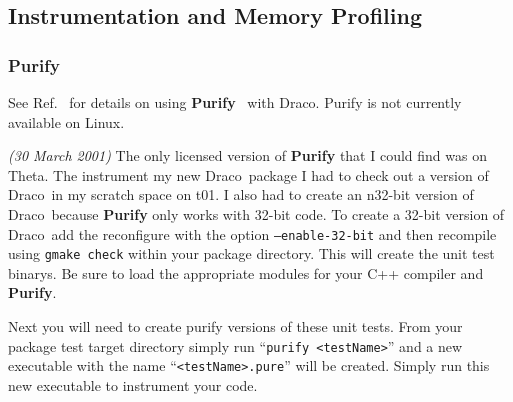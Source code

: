 \documentclass[11pt]{nmemo}
\newcommand{\comp}[1]{\normalfont\footnotesize\texttt{#1}\normalsize}
\newcommand{\draco}{{\normalfont\sffamily Draco}}
\begin{document}




\subsection{Instrumentation and Memory Profiling}

\subsubsection{Purify}

See Ref.~\cite{draco-purify} for details on using
\textbf{Purify}~\cite{purify} with \draco.  Purify is not currently
available on Linux.  

\emph{(30 March 2001)} The only licensed version of \textbf{Purify}
that I could find was on Theta.  The instrument my new \draco\ package
I had to check out a version of \draco\ in my scratch space on t01.  I
also had to create an n32-bit version of \draco\ because
\textbf{Purify} only works with 32-bit code.  To create a 32-bit
version of \draco\ add the reconfigure with the option
\comp{--enable-32-bit} and then recompile using \comp{gmake check}
within your package directory.  This will create the unit test
binarys.  Be sure to load the appropriate modules for your C++
compiler and \textbf{Purify}.

Next you will need to create purify versions of these unit tests.
From your package test target directory simply run ``\comp{purify
 <testName>}'' and a new executable with the name
``\comp{<testName>.pure}'' will be created.  Simply run this new
executable to instrument your code.
\end{document}
